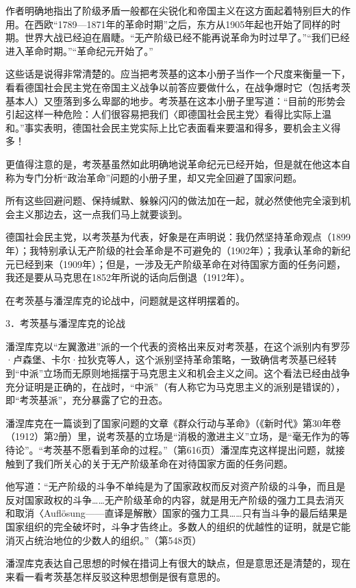 \documentclass[UTF8, 12pt, a4paper]{ctexrep}
\begin{document}
作者明确地指出了阶级矛盾一般都在尖锐化和帝国主义在这方面起着特别巨大的作用。在西欧“1789—1871年的革命时期”之后，东方从1905年起也开始了同样的时期。世界大战已经迫在眉睫。“无产阶级已经不能再说革命为时过早了。”“我们已经进入革命时期。”“革命纪元开始了。”

这些话是说得非常清楚的。应当把考茨基的这本小册子当作一个尺度来衡量一下，看看德国社会民主党在帝国主义战争以前答应要做什么，在战争爆时它（包括考茨基本人）又堕落到多么卑鄙的地步。考茨基在这本小册子里写道：“目前的形势会引起这样一种危险：人们很容易把我们〈即德国社会民主党〉看得比实际上温和。”事实表明，德国社会民主党实际上比它表面看来要温和得多，要机会主义得多！

更值得注意的是，考茨基虽然如此明确地说革命纪元已经开始，但是就在他这本自称为专门分析“政治革命”问题的小册子里，却又完全回避了国家问题。

所有这些回避问题、保持缄默、躲躲闪闪的做法加在一起，就必然使他完全滚到机会主义那边去，这一点我们马上就要谈到。

德国社会民主党，以考茨基为代表，好象是在声明说：我仍然坚持革命观点（1899年）；我特别承认无产阶级的社会革命是不可避免的（1902年）；我承认革命的新纪元已经到来（1909年）；但是，一涉及无产阶级革命在对待国家方面的任务问题，我还是要从马克思在1852年所说的话向后倒退（1912年）。

在考茨基与潘涅库克的论战中，问题就是这样明摆着的。

3．考茨基与潘涅库克的论战

潘涅库克以“左翼激进”派的一个代表的资格出来反对考茨基，在这个派别内有罗莎·卢森堡、卡尔·拉狄克等人，这个派别坚持革命策略，一致确信考茨基已经转到“中派”立场而无原则地摇摆于马克思主义和机会主义之间。这个看法已经由战争充分证明是正确的，在战时，“中派”（有人称它为马克思主义的派别是错误的），即“考茨基派”，充分暴露了它的丑态。

潘涅库克在一篇谈到了国家问题的文章《群众行动与革命》（《新时代》第30年卷（1912）第2册）里，说考茨基的立场是“消极的激进主义”立场，是“毫无作为的等待论”。“考茨基不愿看到革命的过程。”（第616页）潘涅库克这样提出问题，就接触到了我们所关心的关于无产阶级革命在对待国家方面的任务问题。

他写道：“无产阶级的斗争不单纯是为了国家政权而反对资产阶级的斗争，而且是反对国家政权的斗争……无产阶级革命的内容，就是用无产阶级的强力工具去消灭和取消〈Auflösung——直译是解散〉国家的强力工具……只有当斗争的最后结果是国家组织的完全破坏时，斗争才告终止。多数人的组织的优越性的证明，就是它能消灭占统治地位的少数人的组织。”（第548页）

潘涅库克表达自己思想的时候在措词上有很大的缺点，但是意思还是清楚的，现在来看一看考茨基怎样反驳这种思想倒是很有意思的。
\end{document}
